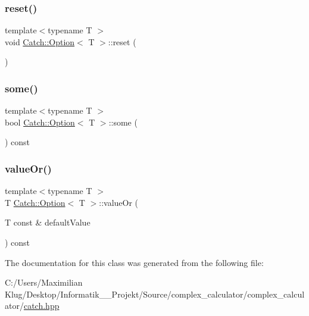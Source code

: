 \mbox{\label{class_catch_1_1_option_a37b4e0e5d4d56296adacd267a616f4e0}} 
\subsubsection{\texorpdfstring{reset()}{reset()}}
{\footnotesize\ttfamily template$<$typename T $>$ \\
void \mbox{\hyperlink{class_catch_1_1_option}{Catch\+::\+Option}}$<$ T $>$\+::reset (\begin{DoxyParamCaption}{ }\end{DoxyParamCaption})\hspace{0.3cm}{\ttfamily [inline]}}

\mbox{\label{class_catch_1_1_option_a97c95829afbe92f2bcc5fd75b32c0825}} 
\subsubsection{\texorpdfstring{some()}{some()}}
{\footnotesize\ttfamily template$<$typename T $>$ \\
bool \mbox{\hyperlink{class_catch_1_1_option}{Catch\+::\+Option}}$<$ T $>$\+::some (\begin{DoxyParamCaption}{ }\end{DoxyParamCaption}) const\hspace{0.3cm}{\ttfamily [inline]}}

\mbox{\label{class_catch_1_1_option_a8d9ae2e30b0eb76fe134a6fbc8423124}} 
\subsubsection{\texorpdfstring{value\+Or()}{valueOr()}}
{\footnotesize\ttfamily template$<$typename T $>$ \\
T \mbox{\hyperlink{class_catch_1_1_option}{Catch\+::\+Option}}$<$ T $>$\+::value\+Or (\begin{DoxyParamCaption}\item[{T const \&}]{default\+Value }\end{DoxyParamCaption}) const\hspace{0.3cm}{\ttfamily [inline]}}



The documentation for this class was generated from the following file\+:\begin{DoxyCompactItemize}
\item 
C\+:/\+Users/\+Maximilian Klug/\+Desktop/\+Informatik\+\_\+\_\+\+Projekt/\+Source/complex\+\_\+calculator/complex\+\_\+calculator/\mbox{\hyperlink{catch_8hpp}{catch.\+hpp}}\end{DoxyCompactItemize}
